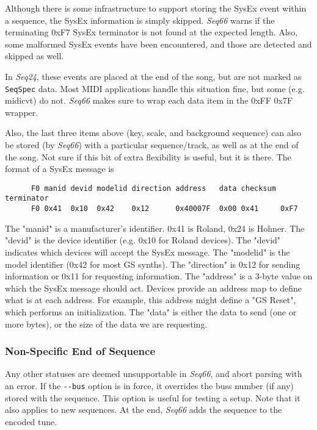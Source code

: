    Although there is some
   infrastructure to support storing the SysEx event within a sequence, the
   SysEx information is simply skipped.  \textsl{Seq66} warns if the
   terminating 0xF7 SysEx terminator is not found at the expected length.
   Also, some malformed SysEx events have been encountered, and those are
   detected and skipped as well.

   In \textsl{Seq24}, these events are placed at the end of the song, but are
   not marked as
   \texttt{SeqSpec} data.  Most MIDI applications handle this situation
   fine, but some (e.g. midicvt) do not.  \textsl{Seq66} makes
   sure to wrap each data item in the 0xFF 0x7F wrapper.

   Also, the last three items above (key, scale, and background sequence) can
   also be stored (by \textsl{Seq66}) with a particular sequence/track,
   as well as at the end of the song.  Not sure if this bit of extra
   flexibility is useful, but it is there.
   The format of a SysEx message is

   \begin{verbatim}
      F0 manid devid modelid direction address   data checksum terminator
      F0 0x41  0x10  0x42    0x12      0x40007F  0x00 0x41     0xF7
   \end{verbatim}

   The "manid" is a manufacturer's identifier. 0x41 is Roland, 0x24 is
   Hohner. The "devid" is the device identifier (e.g. 0x10 for Roland devices).
   The "devid" indicates which devices will accept the SysEx message.
   The "modelid" is the model identifier (0x42 for most GS synths).
   The "direction" is 0x12 for sending information or 0x11 for requesting
   information.
   The "address" is a 3-byte value on which the SysEx message should act.
   Devices provide an address map to define what is at each address.
   For example, this address might define a "GS Reset", which performs
   an initialization.
   The "data" is either the data to send (one or more bytes), or the
   size of the data we are requesting.

\subsubsection{Non-Specific End of Sequence}
\label{subsubsec:midi_format_meta_sequence_ends}

   Any other statuses are deemed unsupportable in \textsl{Seq66}, and
   abort parsing with an error.
   If the \texttt{-{}-bus} option is in force, it overrides the buss number (if
   any) stored with the sequence.  This option is useful for testing a setup.
   Note that it also applies to new sequences.
   At the end, \textsl{Seq66} adds the sequence to the encoded tune.

